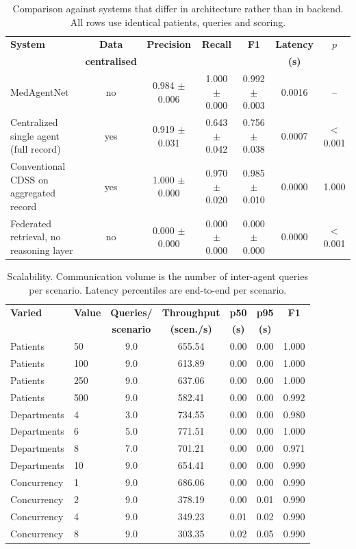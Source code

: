 \begin{table}[!t]
\centering
\caption{Comparison against systems that differ in architecture rather than in backend. All rows use identical patients, queries and scoring.}
\label{tab:r1_baselines}
\small
\begin{tabular}{lcccccc}
\toprule
\textbf{System} & \textbf{Data} & \textbf{Precision} & \textbf{Recall} & \textbf{F1} & \textbf{Latency} & \textbf{$p$} \\
 & \textbf{centralised} & & & & \textbf{(s)} & \\
\midrule
MedAgentNet & no & 0.984 $\pm$ 0.006 & 1.000 $\pm$ 0.000 & 0.992 $\pm$ 0.003 & 0.0016 & -- \\
Centralized single agent (full record) & yes & 0.919 $\pm$ 0.031 & 0.643 $\pm$ 0.042 & 0.756 $\pm$ 0.038 & 0.0007 & $<$0.001 \\
Conventional CDSS on aggregated record & yes & 1.000 $\pm$ 0.000 & 0.970 $\pm$ 0.020 & 0.985 $\pm$ 0.010 & 0.0000 & 1.000 \\
Federated retrieval, no reasoning layer & no & 0.000 $\pm$ 0.000 & 0.000 $\pm$ 0.000 & 0.000 $\pm$ 0.000 & 0.0000 & $<$0.001 \\
\bottomrule
\end{tabular}
\end{table}

\begin{table}[!t]
\centering
\caption{Scalability. Communication volume is the number of inter-agent queries per scenario. Latency percentiles are end-to-end per scenario.}
\label{tab:r1_scalability}
\small
\begin{tabular}{llccccc}
\toprule
\textbf{Varied} & \textbf{Value} & \textbf{Queries/} & \textbf{Throughput} & \textbf{p50} & \textbf{p95} & \textbf{F1} \\
 & & \textbf{scenario} & \textbf{(scen./s)} & \textbf{(s)} & \textbf{(s)} & \\
\midrule
Patients & 50 & 9.0 & 655.54 & 0.00 & 0.00 & 1.000 \\
Patients & 100 & 9.0 & 613.89 & 0.00 & 0.00 & 1.000 \\
Patients & 250 & 9.0 & 637.06 & 0.00 & 0.00 & 1.000 \\
Patients & 500 & 9.0 & 582.41 & 0.00 & 0.00 & 0.992 \\
\midrule
Departments & 4 & 3.0 & 734.55 & 0.00 & 0.00 & 0.980 \\
Departments & 6 & 5.0 & 771.51 & 0.00 & 0.00 & 1.000 \\
Departments & 8 & 7.0 & 701.21 & 0.00 & 0.00 & 0.971 \\
Departments & 10 & 9.0 & 654.41 & 0.00 & 0.00 & 0.990 \\
\midrule
Concurrency & 1 & 9.0 & 686.06 & 0.00 & 0.00 & 0.990 \\
Concurrency & 2 & 9.0 & 378.19 & 0.00 & 0.01 & 0.990 \\
Concurrency & 4 & 9.0 & 349.23 & 0.01 & 0.02 & 0.990 \\
Concurrency & 8 & 9.0 & 303.35 & 0.02 & 0.05 & 0.990 \\
\bottomrule
\end{tabular}
\end{table}


